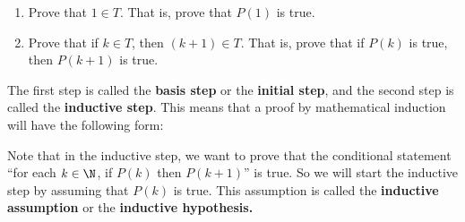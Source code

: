 \begin{enumerate}
\item Prove that  $1 \in T$\!.  That is, prove that  $P( 1 )$ is true.

\item Prove that if  $k \in T$\!, then  $\left( {k + 1} \right) \in T$\!.  That is, prove that if  $P( k )$ is true, then  $P( {k + 1} )$ is true.

\end{enumerate}
The first step is called the \textbf{basis step}
%
%
 or the \textbf{initial step}, and the second step is called the \textbf{inductive step}.
%
%
  This means that a proof by mathematical induction will have the following form:
\begin{flushleft}
\end{flushleft}

\newpar
Note that in the inductive step, we want to prove that the conditional statement ``for each $k \in \N$, if 
$P(k)$ then $P(k + 1)$''  is true.  So we will start the inductive step by assuming that   $P( k )$  is true.  This assumption is called the \textbf{inductive assumption}
%
 or the \textbf{inductive hypothesis.}
%

